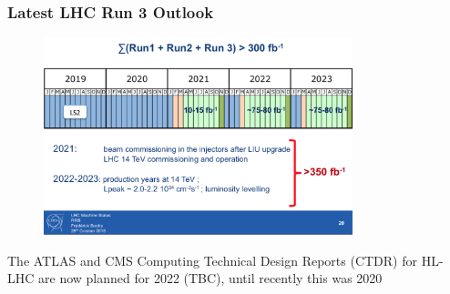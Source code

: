 \begin{frame}
\frametitle{Latest LHC Run 3 Outlook}

\begin{figure}[htbp]
\begin{center}
\includegraphics[width=0.8\textwidth]{images/Run3-graphic.png}
\end{center}
\end{figure}

\small{The ATLAS and CMS Computing Technical Design Reports (CTDR) for HL-LHC are now planned for 2022 (TBC), until recently this was 2020}

\end{frame}



